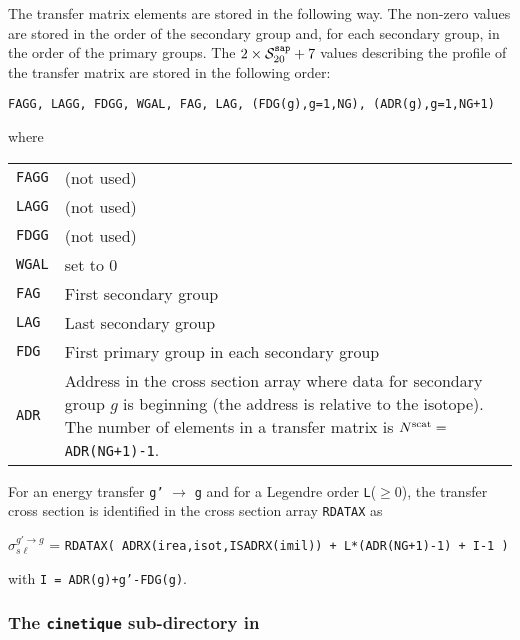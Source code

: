 \vskip 0.1cm

The transfer matrix elements are stored in the following way. The non-zero values are stored in the order
of the secondary group and, for each secondary group, in the order of the primary groups.
The $2\times \mathcal{S}^{\tt sap}_{20}+7$ values describing the profile of the transfer matrix
are stored in the following order:

\vskip 0.1cm

{\tt FAGG, LAGG, FDGG, WGAL, FAG, LAG, (FDG(g),g=1,NG), (ADR(g),g=1,NG+1)}

\vskip 0.1cm

\noindent where

\vskip 0.1cm

\begin{tabular}{ p{2cm} p{13cm} }
{\tt FAGG} & (not used) \\
{\tt LAGG} & (not used) \\
{\tt FDGG} & (not used) \\
{\tt WGAL} & set to 0 \\
{\tt FAG}  & First secondary group \\
{\tt LAG}  & Last secondary group \\
{\tt FDG}  & First primary group in each secondary group \\
{\tt ADR}  & Address in the cross section array where data for secondary group $g$
             is beginning (the address is relative to the isotope). The number of elements in
             a transfer matrix is $N^{\rm scat}=${\tt ADR(NG+1)-1}.
\end{tabular}

\vskip 0.1cm

For an energy transfer {\tt g'} $\rightarrow$ {\tt g} and for a Legendre order {\tt L}($\geq 0$),
the transfer cross section is identified in the cross section array {\tt RDATAX} as

\centerline{$\sigma_{s\ell}^{g' \rightarrow g}$ = 
{\tt RDATAX( ADRX(irea,isot,ISADRX(imil)) + L*(ADR(NG+1)-1) + I-1 )}}

\noindent with {\tt I = ADR(g)+g'-FDG(g)}.
\clearpage

\subsubsection{The {\tt cinetique} sub-directory in }\label{sect:sapdircine}

\vskip -0.5cm

